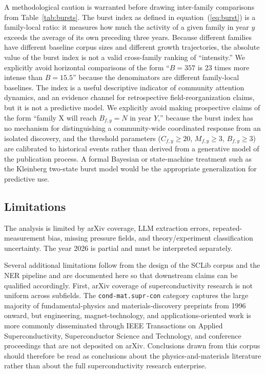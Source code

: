 \documentclass[11pt]{article}
\begin{document}
A methodological caution is warranted before drawing inter-family comparisons from Table~\ref{tab:bursts}. The burst index as defined in equation~(\ref{eq:burst}) is a family-local ratio: it measures how much the activity of a given family in year $y$ exceeds the average of its own preceding three years. Because different families have different baseline corpus sizes and different growth trajectories, the absolute value of the burst index is not a valid cross-family ranking of ``intensity.'' We explicitly avoid horizontal comparisons of the form ``$B=357$ is 23 times more intense than $B=15.5$'' because the denominators are different family-local baselines. The index is a useful descriptive indicator of community attention dynamics, and an evidence channel for retrospective field-reorganization claims, but it is not a predictive model. We explicitly avoid making prospective claims of the form ``family X will reach $B_{f,y}=N$ in year $Y$,'' because the burst index has no mechanism for distinguishing a community-wide coordinated response from an isolated discovery, and the threshold parameters ($C_{f,y}\geq 20$, $M_{f,y}\geq 3$, $B_{f,y}\geq 3$) are calibrated to historical events rather than derived from a generative model of the publication process. A formal Bayesian or state-machine treatment such as the Kleinberg two-state burst model \cite{kleinberg2003burst} would be the appropriate generalization for predictive use.

\subsection{Limitations}

The analysis is limited by arXiv coverage, LLM extraction errors, repeated-measurement bias, missing pressure fields, and theory/experiment classification uncertainty. The year 2026 is partial and must be interpreted separately.

Several additional limitations follow from the design of the SCLib corpus and the NER pipeline and are documented here so that downstream claims can be qualified accordingly. First, arXiv coverage of superconductivity research is not uniform across subfields. The \texttt{cond-mat.supr-con} category captures the large majority of fundamental-physics and materials-discovery preprints from 1996 onward, but engineering, magnet-technology, and applications-oriented work is more commonly disseminated through IEEE Transactions on Applied Superconductivity, Superconductor Science and Technology, and conference proceedings that are not deposited on arXiv. Conclusions drawn from this corpus should therefore be read as conclusions about the physics-and-materials literature rather than about the full superconductivity research enterprise.
\end{document}
